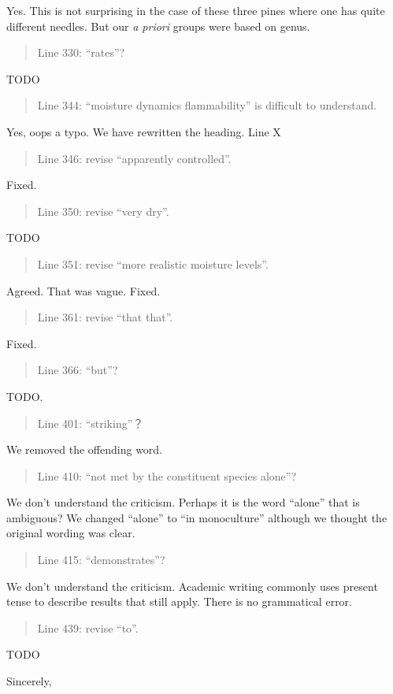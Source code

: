 \documentclass[letterpaper, 12pt]{letter}
\begin{document}
\begin{letter}{}
Yes.  This is not surprising in the case of these three pines where one has quite different needles. But our \emph{a priori} groups were based on genus.

\begin{quote}
Line 330: “rates”?
\end{quote}

TODO

\begin{quote}
Line 344: “moisture dynamics flammability” is difficult to understand.
\end{quote}

Yes, oops a typo. We have rewritten the heading. Line X

\begin{quote}
Line 346: revise “apparently controlled”.
\end{quote}

Fixed.

\begin{quote}
Line 350: revise “very dry”.
\end{quote}

TODO

\begin{quote}
Line 351: revise “more realistic moisture levels”.
\end{quote}

Agreed. That was vague. Fixed.

\begin{quote}
Line 361: revise “that that”.
\end{quote}

Fixed.

\begin{quote}
Line 366: “but”?
\end{quote}

TODO.

\begin{quote}
Line 401: “striking”？
\end{quote}

We removed the offending word.

\begin{quote}
Line 410: “not met by the constituent species alone”?
\end{quote}

We don't understand the criticism. Perhaps it is the word ``alone'' that is ambiguous?  We changed ``alone'' to ``in monoculture'' although we thought the original wording was clear.

\begin{quote}
Line 415: “demonstrates”?
\end{quote}

We don't understand the criticism. Academic writing commonly uses present tense to describe results that still apply. There is no grammatical error.

\begin{quote}
Line 439: revise “to”.
\end{quote}

TODO

\closing{Sincerely,}

\end{letter}
\end{document}
